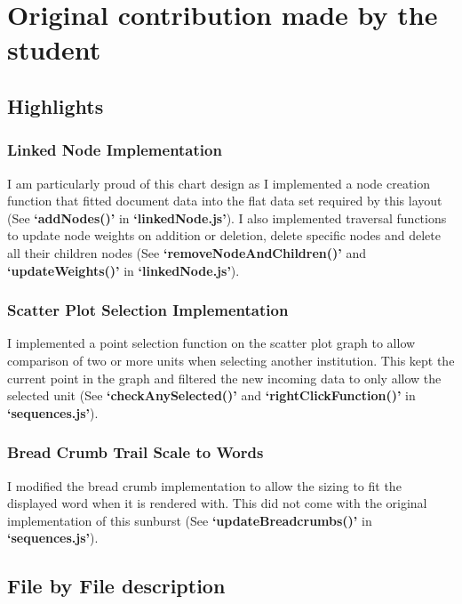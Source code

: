 \documentclass[a4paper, 11pt]{article}
\begin{document}
\section{Original contribution made by the student}
\subsection{Highlights} 
\subsubsection{Linked Node Implementation}
I am particularly proud of this chart design as I implemented a node creation function that fitted document data into the flat data set required by this layout (See \textbf{`addNodes()'} in \textbf{`linkedNode.js'}). I also implemented traversal functions to update node weights on addition or deletion, delete specific nodes and delete all their children nodes (See \textbf{`removeNodeAndChildren()'} and \textbf{`updateWeights()'} in \textbf{`linkedNode.js'}).

\subsubsection{Scatter Plot Selection Implementation}
I implemented a point selection function on the scatter plot graph to allow comparison of two or more units when selecting another institution. This kept the current point in the graph and filtered the new incoming data to only allow the selected unit (See \textbf{`checkAnySelected()'} and \textbf{`rightClickFunction()'} in \textbf{`sequences.js'}).

\subsubsection{Bread Crumb Trail Scale to Words}
I modified the bread crumb implementation to allow the sizing to fit the displayed word when it is rendered with. This did not come with the original implementation of this sunburst (See \textbf{`updateBreadcrumbs()'} in \textbf{`sequences.js'}).

\subsection{File by File description}
\end{document}
